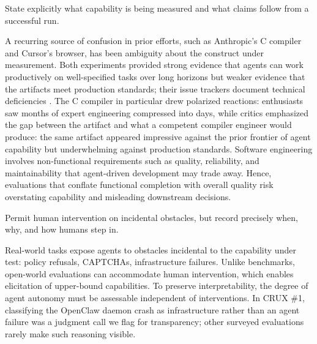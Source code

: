 \documentclass{article}
\begin{document}
\begin{claimbox}
State explicitly what capability is being measured and what claims follow from a successful run.
\end{claimbox}
A recurring source of confusion in prior efforts, such as Anthropic's C compiler and Cursor's browser, has been ambiguity about the construct under measurement. Both experiments provided strong evidence that agents can work productively on well-specified tasks over long horizons but weaker evidence that the artifacts meet production standards; their issue trackers document technical deficiencies \citep{githubComIssues1,githubComIssues98}. The C compiler in particular drew polarized reactions: enthusiasts saw months of expert engineering compressed into days, while critics emphasized the gap between the artifact and what a competent compiler engineer would produce: the same artifact appeared impressive against the prior frontier of agent capability but underwhelming against production standards. Software engineering involves non-functional requirements such as quality, reliability, and maintainability \citep{personalUtdallasEduBook} that agent-driven development may trade away. Hence, evaluations that conflate functional completion with overall quality risk overstating capability and misleading downstream decisions.

\begin{claimbox}
Permit human intervention on incidental obstacles, but record precisely when, why, and how humans step in.
\end{claimbox}
Real-world tasks expose agents to obstacles incidental to the capability under test: policy refusals, CAPTCHAs, infrastructure failures. Unlike benchmarks, open-world evaluations can accommodate human intervention, which enables elicitation of upper-bound capabilities. To preserve interpretability, the degree of agent autonomy must be assessable independent of interventions. In CRUX \#1, classifying the OpenClaw daemon crash as infrastructure rather than an agent failure was a judgment call we flag for transparency; other surveyed evaluations rarely make such reasoning visible.
\end{document}
